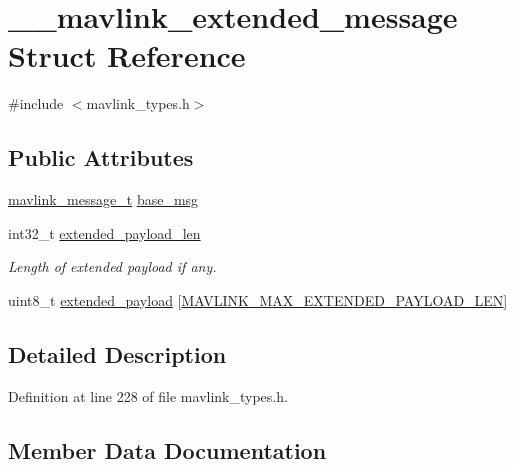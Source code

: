 \hypertarget{struct____mavlink__extended__message}{}\section{\+\_\+\+\_\+mavlink\+\_\+extended\+\_\+message Struct Reference}
\label{struct____mavlink__extended__message}


{\ttfamily \#include $<$mavlink\+\_\+types.\+h$>$}

\subsection*{Public Attributes}
\begin{DoxyCompactItemize}
\item 
\mbox{\hyperlink{include__v0_89_2mavlink__types_8h_a63b963764c09dc72f4910c1521e325b9}{mavlink\+\_\+message\+\_\+t}} \mbox{\hyperlink{struct____mavlink__extended__message_a52d142dbcf71540bfc8199b45f676126}{base\+\_\+msg}}
\item 
int32\+\_\+t \mbox{\hyperlink{struct____mavlink__extended__message_a7fcf54d2c29dc157a78caacae8d998cf}{extended\+\_\+payload\+\_\+len}}
\begin{DoxyCompactList}\small\item\em Length of extended payload if any. \end{DoxyCompactList}\item 
uint8\+\_\+t \mbox{\hyperlink{struct____mavlink__extended__message_afccf6dc3341050b0a63ac0d069d66a31}{extended\+\_\+payload}} \mbox{[}\mbox{\hyperlink{include__v1_80_2mavlink__types_8h_a03fb68f36575eb133e3c046f55295837}{M\+A\+V\+L\+I\+N\+K\+\_\+\+M\+A\+X\+\_\+\+E\+X\+T\+E\+N\+D\+E\+D\+\_\+\+P\+A\+Y\+L\+O\+A\+D\+\_\+\+L\+EN}}\mbox{]}
\end{DoxyCompactItemize}


\subsection{Detailed Description}


Definition at line 228 of file mavlink\+\_\+types.\+h.



\subsection{Member Data Documentation}
\mbox{\label{struct____mavlink__extended__message_a52d142dbcf71540bfc8199b45f676126}} 
